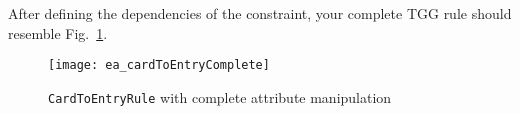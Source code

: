 After defining the dependencies of the constraint, your complete TGG rule should resemble Fig.~\ref{fig:cardtoentry_complete}.

\newpage

\begin{figure}[htbp]
\begin{center}
  \texttt{[image: ea\_cardToEntryComplete]}
  \caption{\texttt{CardToEntryRule} with complete attribute manipulation}
  \label{fig:cardtoentry_complete}
\end{center}
\end{figure}


